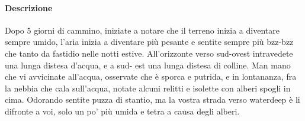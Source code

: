 \documentclass{article}
\begin{document}
\paragraph{	Descrizione } Dopo 5 giorni di cammino, iniziate a notare che il terreno inizia a diventare sempre umido, l'aria inizia a diventare più pesante e sentite sempre più bzz-bzz che tanto da fastidio nelle notti estive. All'orizzonte verso sud-ovest intravedete una lunga distesa d'acqua, e a sud- est una lunga distesa di colline. Man mano che vi avvicinate all'acqua, osservate che è sporca e putrida, e in lontananza, fra la nebbia che cala sull'acqua, notate alcuni relitti e isolette con alberi spogli in cima. Odorando  sentite puzza di stantio, ma la vostra strada verso waterdeep è li difronte a voi, solo un po' più umida e tetra a causa degli alberi. 
\end{document}
